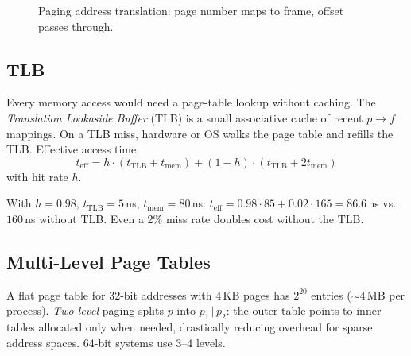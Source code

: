\begin{figure}[h!]
\centering
{}
\caption{Paging address translation: page number maps to frame, offset passes through.}
\label{fig:paging}
\end{figure}

\subsection{TLB}
Every memory access would need a page-table lookup without caching. The
\emph{Translation Lookaside Buffer} (TLB) is a small associative cache of
recent $p\to f$ mappings. On a TLB miss, hardware or OS walks the page table
and refills the TLB. Effective access time:
\[
  t_{\text{eff}} = h \cdot (t_{\text{TLB}}+t_{\text{mem}}) + (1-h)\cdot(t_{\text{TLB}}+2t_{\text{mem}})
\]
with hit rate $h$.

\begin{example}
With $h=0.98$, $t_{\text{TLB}}=5$\,ns, $t_{\text{mem}}=80$\,ns:
$t_{\text{eff}}=0.98\cdot85+0.02\cdot165=86.6$\,ns vs.\ $160$\,ns without TLB.
Even a 2\% miss rate doubles cost without the TLB.
\end{example}

\subsection{Multi-Level Page Tables}
A flat page table for 32-bit addresses with 4\,KB pages has $2^{20}$ entries
($\sim$4\,MB per process). \emph{Two-level} paging splits $p$ into
$p_1\,|\,p_2$: the outer table points to inner tables allocated only when
needed, drastically reducing overhead for sparse address spaces. 64-bit systems
use 3--4 levels.


